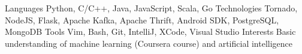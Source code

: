 \begin{cvskills}
  \cvskill
    {Languages}
    {Python, C/C++, Java, JavaScript, Scala, Go}
  \cvskill
    {Technologies}
    {Tornado, NodeJS, Flask, Apache Kafka, Apache Thrift, Android SDK, PostgreSQL, MongoDB}
  \cvskill
    {Tools}
    {Vim, Bash, Git, IntelliJ, XCode, Visual Studio}
  \cvskill
    {Interests}
    {Basic understanding of machine learning (Coursera course) and artificial intelligence}
\end{cvskills}
